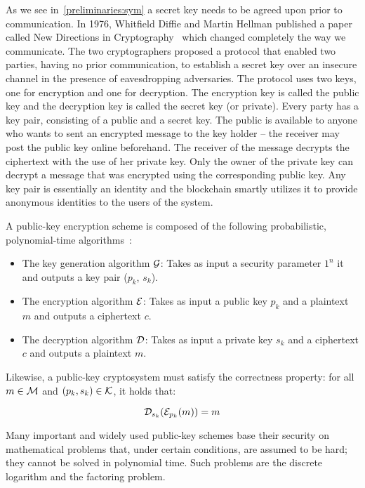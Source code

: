 As we see in~\ref{preliminaries:sym} a secret key needs to be agreed upon prior to communication. In 1976, Whitfield Diffie and Martin Hellman published a paper called New Directions in Cryptography~\cite{Diffie:2006:NDC:2263321.2269104} which changed completely the way we communicate. The two cryptographers proposed a protocol that enabled two parties, having no prior communication, to establish a secret key over an insecure channel in the presence of eavesdropping adversaries. The protocol uses two keys, one for encryption and one for decryption. The encryption key is called the public key and the decryption key is called the secret key (or private). Every party has a key pair, consisting of a public and a secret key. The public is available to anyone who wants to sent an encrypted message to the key holder -- the receiver may post the public key online beforehand. The receiver of the message decrypts the ciphertext with the use of her private key. Only the owner of the private key can decrypt a message that was encrypted using the corresponding public key. Any key pair is essentially an identity and the blockchain smartly utilizes it to provide anonymous identities to the users of the system.

A public-key encryption scheme is composed of the following probabilistic, polynomial-time algorithms~\cite{Katz:2014:IMC:2700550, kiagias:crypto}:

\begin{itemize}
  \item The key generation algorithm $\mathcal{G}$: Takes as input a security parameter $1^{n}$ it and outputs a key pair ($p_k$, $s_k$).
  \item The encryption algorithm $\mathcal{E}$: Takes as input a public key $p_k$ and a plaintext $m$ and outputs a ciphertext $c$.
  \item The decryption algorithm $\mathcal{D}$: Takes as input a private key $s_k$ and a ciphertext $c$ and outputs a plaintext $m$.
\end{itemize}

Likewise, a public-key cryptosystem must satisfy the correctness property: for all $m \in \mathcal{M}$ and $(p_k, s_k) \in \mathcal{K}$, it holds that:

\begin{equation*}
  \mathcal{D}_{s_k}(\mathcal{E}_{p_k}(m)) = m
\end{equation*}

Many important and widely used public-key schemes base their security on mathematical problems that, under certain conditions, are assumed to be hard; they cannot be solved in polynomial time. Such problems are the discrete logarithm and the factoring problem.

